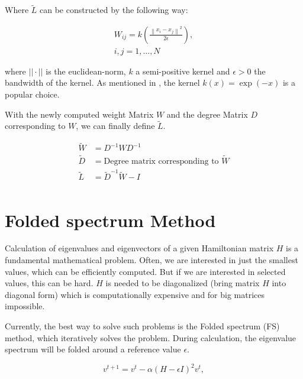 Where $\tilde{L}$ can be constructed by the following way:

\begin{equation}
    \begin{aligned}
        W_{ij} = k \left ( \frac{\left \| x_i - x_j \right \|^2}{2 \epsilon}  \right ), \\
        i, j = 1, \dots, N
    \end{aligned}
\end{equation}

where $||\cdot ||$ is the euclidean-norm, $k$ a semi-positive kernel 
and  $\epsilon > 0$ the bandwidth of the kernel. As mentioned in \cite{LaplaceRandomProjections},
the kernel $k(x) = \exp (-x)$ is a popular choice.

With the newly computed weight Matrix $W$ and the degree Matrix $D$ corresponding to $W$, we can finally 
define $\tilde{L}$.

\begin{equation}
    \begin{aligned}
        \tilde{W} &= D^{-1} W D^{-1} \\
        \tilde{D} &= \text{Degree matrix corresponding to } \tilde{W} \\
        \tilde{L} &= \tilde{D}^{-1} \tilde{W} - I \\
    \end{aligned}
\end{equation}


\section{Folded spectrum Method}
Calculation of eigenvalues and eigenvectors of a given Hamiltonian matrix $H$ 
is a fundamental mathematical problem. Often, we are interested in just the smallest 
values, which can be efficiently computed. But if we are interested in selected values,
this can be hard. $H$ is needed to be diagonalized (bring matrix $H$ into diagonal form) 
which is computationally expensive and for big matrices impossible.

Currently, the best way to solve such problems is the Folded spectrum (FS) \cite{foldedSpectrumMethod} method,
which iteratively solves the problem. During calculation, the eigenvalue spectrum will be folded around a reference 
value $\epsilon$.

\begin{equation}
    v^{t+1} = v^t - \alpha (H - \epsilon I )^2 v^t ,
\end{equation}

